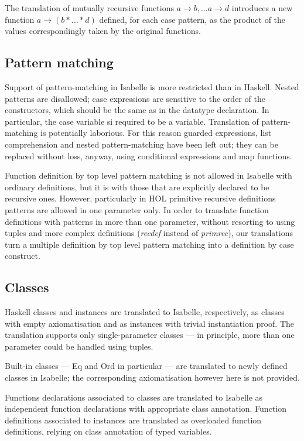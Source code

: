 \documentclass[a4paper,12pt]{article}
\begin{document}
The translation of mutually recursive functions $a \rightarrow b, \ldots a
\rightarrow d$ introduces a new function $a \rightarrow (b * \ldots * d)$
defined, for each case pattern, as the product of the values
correspondingly taken by the original functions.


\subsection*{Pattern matching}

Support of pattern-matching in Isabelle is more restricted than in
Haskell. Nested patterns are disallowed; case expressions are
sensitive to the order of the constructors, which should be the same
as in the datatype declaration. In particular, the case variable si
required to be a variable. Translation of pattern-matching is
potentially laborious. For this reason guarded expressions, list
comprehension and nested pattern-matching have been left out; they can
be replaced without loss, anyway, using conditional expressions and
map functions.

Function definition by top level pattern matching is not allowed in
Isabelle with ordinary definitions, but it is with those that are
explicitly declared to be recursive ones. However, particularly in HOL
primitive recursive definitions patterns are allowed in one parameter
only. In order to translate function definitions with patterns in more
than one parameter, without resorting to using tuples and more complex
definitions (\emph{recdef} instead of \emph{primrec}), our
translations turn a multiple definition by top level pattern matching
into a definition by case construct.

\subsection*{Classes}

Haskell classes and instances are translated to Isabelle,
respectively, as classes with empty axiomatisation and as instances
with trivial instantiation proof.  The translation supports only
single-parameter classes --- in principle, more than one parameter
could be handled using tuples.  

Built-in classes --- Eq and Ord in particular --- are translated to
newly defined classes in Isabelle; the corresponding axiomatisation
however here is not provided.

Functions declarations associated to classes are translated to
Isabelle as independent function declarations with appropriate class
annotation. Function definitions associated to instances are
translated as overloaded function definitions, relying on class
annotation of typed variables.
\end{document}

